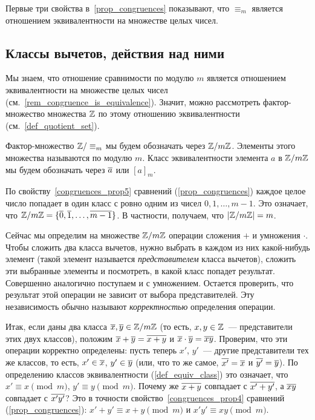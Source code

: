 \begin{remark}\label{rem_congruence_is_equivalence}
Первые три свойства в~\ref{prop_congruences} показывают, что
$\equiv_m$ является отношением
эквивалентности на множестве целых чисел.
\end{remark}


\subsection{Классы вычетов, действия над ними}\label{subsect_residues}


 Мы знаем, что отношение сравнимости по модулю $m$ является отношением
эквивалентности на множестве целых чисел
(см.~\ref{rem_congruence_is_equivalence}). Значит, можно рассмотреть
фактор-множество множества $\mathbb Z$ по этому отношению эквивалентности
(см.~\ref{def_quotient_set}).
\begin{definition}
Фактор-множество $\mathbb Z/\equiv_m$ мы
будем обозначать через $\mathbb Z/m\mathbb Z$. Элементы этого множества
называются  по модулю $m$.
Класс эквивалентности элемента $a$ в $\mathbb Z/m\mathbb Z$ мы будем
обозначать через $\overline{a}$ или $[a]_m$.
\end{definition}

\begin{remark}\label{rem_cong_representatives}
По свойству~\ref{congruences_prop5} сравнений (\ref{prop_congruences})
каждое целое число попадает в один класс с ровно одним из чисел
$0,1,\dots,m-1$. Это означает, что $\mathbb Z/m\mathbb
Z=\{\overline{0},\overline{1},\dots,\overline{m-1}\}$. В частности, получаем, что $|\mathbb
Z/m\mathbb Z|=m$.
\end{remark}

Сейчас мы определим на множестве $\mathbb Z/m\mathbb Z$ операции сложения $+$
и умножения $\cdot$. Чтобы сложить два класса вычетов, нужно выбрать в
каждом из них какой-нибудь элемент (такой элемент называется {\it
  представителем} класса вычетов), сложить эти выбранные элементы и
посмотреть, в какой класс попадет результат. Совершенно аналогично
поступаем и с умножением. Остается проверить, что результат этой
операции не зависит от выбора представителей. Эту независимость обычно
называют {\it корректностью} определения операции.

Итак, если даны два класса $\overline{x}, \overline{y}\in\mathbb Z/m\mathbb Z$ (то есть,
$x,y\in\mathbb Z$~--- представители этих двух классов), положим
$\overline{x}+\overline{y}=\overline{x+y}$ и $\overline{x}\cdot\overline{y}=\overline{xy}$.
Проверим, что эти операции корректно определены:
пусть теперь $x'$, $y'$~--- другие представители тех же классов, то
есть, $x'\in\overline{x}$, $y'\in\overline{y}$ (или, что то же самое,
$\overline{x'}=\overline{x}$ и $\overline{y'}=\overline{y}$). По определению классов
эквивалентности (\ref{def_equiv_class}) это означает, что $x'\equiv
x\pmod m$, $y'\equiv y\pmod m$. Почему же $\overline{x+y}$ совпадает с
$\overline{x'+y'}$, а $\overline{xy}$ совпадает с $\overline{x'y'}$? Это в точности
свойство~\ref{congruences_prop4} сравнений (\ref{prop_congruences}):
$x'+y'\equiv x+y\pmod m$ и $x'y'\equiv xy\pmod m$.

